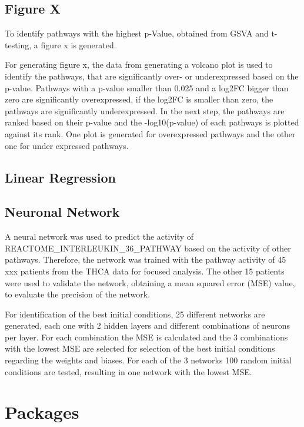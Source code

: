 \documentclass[
  parskip,
  oneside]{scrreprt}
\begin{document}
\hypertarget{figure-x}{%
\subsection{Figure X}\label{figure-x}}

To identify pathways with the highest p-Value, obtained from GSVA and
t-testing, a figure x is generated.

For generating figure x, the data from generating a volcano plot is used
to identify the pathways, that are significantly over- or underexpressed
based on the p-value. Pathways with a p-value smaller than 0.025 and a
log2FC bigger than zero are significantly overexpressed, if the log2FC
is smaller than zero, the pathways are significantly underexpressed. In
the next step, the pathways are ranked based on their p-value and the
-log10(p-value) of each pathways is plotted against its rank. One plot
is generated for overexpressed pathways and the other one for under
expressed pathways.

\hypertarget{linear-regression}{%
\subsection{Linear Regression}\label{linear-regression}}

\hypertarget{neuronal-network}{%
\subsection{Neuronal Network}\label{neuronal-network}}

A neural network was used to predict the activity of
REACTOME\_INTERLEUKIN\_36\_PATHWAY based on the activity of other
pathways. Therefore, the network was trained with the pathway activity
of 45 xxx patients from the THCA data for focused analysis. The other 15
patients were used to validate the network, obtaining a mean squared
error (MSE) value, to evaluate the precision of the network.

For identification of the best initial conditions, 25 different networks
are generated, each one with 2 hidden layers and different combinations
of neurons per layer. For each combination the MSE is calculated and the
3 combinations with the lowest MSE are selected for selection of the
best initial conditions regarding the weights and biases. For each of
the 3 networks 100 random initial conditions are tested, resulting in
one network with the lowest MSE.

\hypertarget{packages}{%
\section{Packages}\label{packages}}
\end{document}
